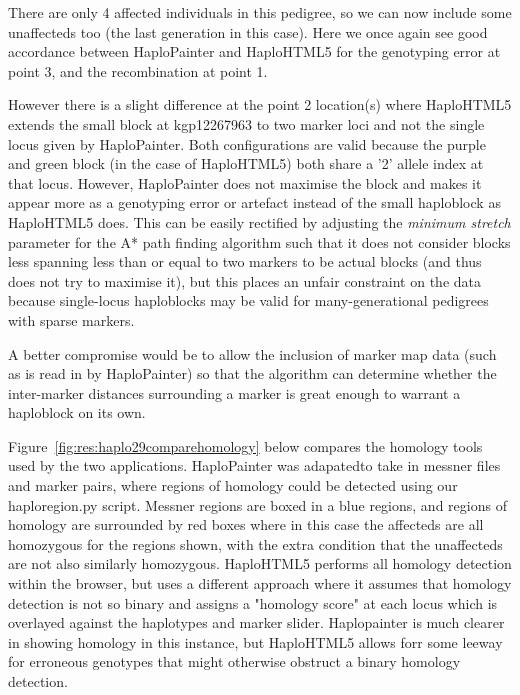 \begin{spacing}{1.38}
There are only 4 affected individuals in this pedigree, so we can now include some unaffecteds too (the last  generation in this case). Here we once again see good accordance between HaploPainter and HaploHTML5 for the genotyping error at point 3, and the recombination at point 1. 

However there is a slight difference at the point 2 location(s) where HaploHTML5 extends the small block at kgp12267963 to two marker loci and not the single locus given by HaploPainter. Both configurations are valid because the purple and green block (in the case of HaploHTML5)  both  share a '2' allele index at that locus. However, HaploPainter does not maximise the block and makes it appear more as a genotyping error or artefact instead of the small haploblock as HaploHTML5 does. This can be easily rectified by adjusting the \textit{minimum stretch} parameter for the A* path finding algorithm such that it does not consider blocks less spanning less than or equal to two markers to be actual blocks (and thus does not try to maximise it), but this places an unfair constraint on the data because single-locus haploblocks may be valid for many-generational pedigrees with sparse markers.  

A better compromise would be to allow the inclusion of marker map data (such as is read in by HaploPainter) so that the algorithm can determine whether the inter-marker distances surrounding a marker is great enough to warrant a haploblock on its own.

Figure~\ref{fig:res:haplo29comparehomology} below compares the homology tools used by the two applications. HaploPainter was adapatedto take in messner files and marker pairs, where regions of homology could be detected using our haploregion.py script. Messner regions are boxed in a blue regions, and regions of homology are surrounded by red boxes where in this case the affecteds are all homozygous for the regions shown, with the extra condition that the unaffecteds are not also similarly homozygous.
 HaploHTML5 performs all homology detection within the browser, but uses a different approach where it assumes that homology detection is not so binary and assigns a "homology score" at each locus which is overlayed against the haplotypes and marker slider. Haplopainter is much clearer in showing homology in this instance, but HaploHTML5 allows forr some leeway for erroneous genotypes that might otherwise obstruct a binary homology detection.
\end{spacing}

